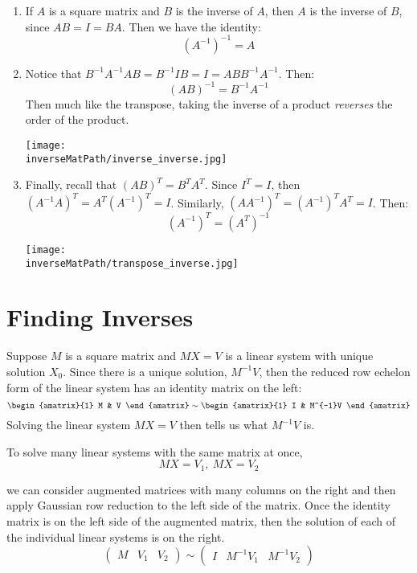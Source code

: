 \begin{enumerate}
\item If $A$ is a square matrix and $B$ is the inverse of $A$, then $A$ is the inverse of $B$, since $AB=I=BA$.  Then we have the identity:
\[
(A^{-1})^{-1}=A
\]

\item Notice that $B^{-1}A^{-1}AB=B^{-1}IB=I=ABB^{-1}A^{-1}$.
Then:
\[
(AB)^{-1}=B^{-1}A^{-1}
\]
Then much like the transpose, taking the inverse of a product \emph{reverses} the order of the product.


\begin{center}
\texttt{[image: \\inverseMatPath/inverse\_inverse.jpg]}
\end{center}

\item Finally, recall that $(AB)^T=B^TA^T$.  Since $I^T=I$, then $(A^{-1}A)^T=A^T(A^{-1})^T=I$.  Similarly, $(AA^{-1})^T=(A^{-1})^TA^T=I$.  Then:
\[
(A^{-1})^T=(A^T)^{-1}
\]
\begin{center}
\texttt{[image: \\inverseMatPath/transpose\_inverse.jpg]}
\end{center}
\end{enumerate}





\section{Finding Inverses}

Suppose $M$ is a square matrix and $MX=V$ is a linear system with unique solution $X_0$.  Since there is a unique solution, $M^{-1}V$, then the reduced row echelon form of the linear system has an identity matrix on the left:
\[
\begin{amatrix}{1}
M & V
\end{amatrix}
\sim
\begin{amatrix}{1}
I & M^{-1}V
\end{amatrix}
\]
Solving the linear system $MX=V$ then tells us what $M^{-1}V$ is.  

To solve many linear systems with the same matrix at once, 
$$MX=V_1,~MX=V_2$$

we can consider augmented matrices with 
many columns on the right 
 and then apply Gaussian row reduction to the left side of the matrix.  Once the identity matrix is on the left side of the augmented matrix, then the solution of each of the individual linear systems is on the right.
 \[
\left(\begin{array}{c|cc}
M & V_1&V_2
\end{array}\right)
\sim
\left(\begin{array}{c|cc}
I & M^{-1}V_1 & M^{-1}V_2
\end{array}\right)
\]


